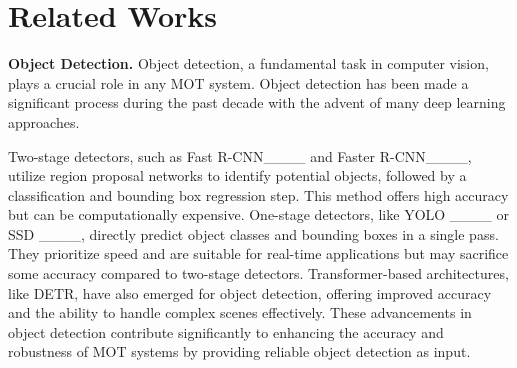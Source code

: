 \section{Related Works}
\label{related-works}

\textbf{Object Detection.} Object detection, a fundamental task in computer vision, plays a crucial role in any MOT system. Object detection has been made a significant process during the past decade with the advent of many deep learning approaches. 

Two-stage detectors, such as Fast R-CNN____ and Faster R-CNN____, utilize region proposal networks to identify potential objects, followed by a classification and bounding box regression step. This method offers high accuracy but can be computationally expensive. One-stage detectors, like YOLO ____ or SSD ____, directly predict object classes and bounding boxes in a single pass. They prioritize speed and are suitable for real-time applications but may sacrifice some accuracy compared to two-stage detectors. Transformer-based architectures, like DETR, have also emerged for object detection, offering improved accuracy and the ability to handle complex scenes effectively. These advancements in object detection contribute significantly to enhancing the accuracy and robustness of MOT systems by providing reliable object detection as input.

